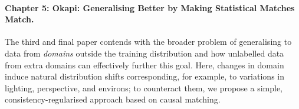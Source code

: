 \paragraph{Chapter 5: Okapi: Generalising Better by Making Statistical Matches Match.}
%
The third and final paper contends with the broader problem of generalising to data from
\emph{domains} outside the training distribution  and how unlabelled data from extra domains can
effectively further this goal.
%
Here, changes in domain induce natural distribution shifts corresponding, for example, to
variations in lighting, perspective, and environs; to counteract them, we propose a simple,
consistency-regularised approach based on causal matching.



    





%









